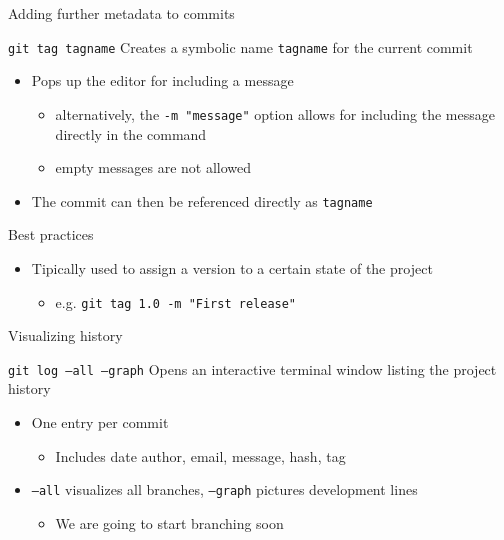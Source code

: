 \documentclass[presentation]{beamer}
\begin{document}
\begin{frame}{Adding further metadata to commits}
    \begin{block}{\texttt{git tag tagname}}
        Creates a symbolic name \texttt{tagname} for the current commit
        \begin{itemize}
            \item Pops up the editor for including a message
            \begin{itemize}
                \item alternatively, the \texttt{-m "message"} option allows for including the message directly in the command
                \item empty messages are not allowed
            \end{itemize}
            \item The commit can then be referenced directly as \texttt{tagname}
        \end{itemize}
    \end{block}
    \begin{block}{Best practices}
        \begin{itemize}
            \item Tipically used to assign a version to a certain state of the project
            \begin{itemize}
                \item e.g. \texttt{git tag 1.0 -m "First release"}
            \end{itemize}
        \end{itemize}
    \end{block}
\end{frame}

\begin{frame}{Visualizing history}
    \begin{block}{\texttt{git log --all --graph}}
        Opens an interactive terminal window listing the project history
        \begin{itemize}
            \item One entry per commit
            \begin{itemize}
                \item Includes date author, email, message, hash, tag
            \end{itemize}
            \item \texttt{--all} visualizes all branches, \texttt{--graph} pictures development lines
            \begin{itemize}
                \item We are going to start branching soon
            \end{itemize}
        \end{itemize}
    \end{block}
\end{frame}
\end{document}

